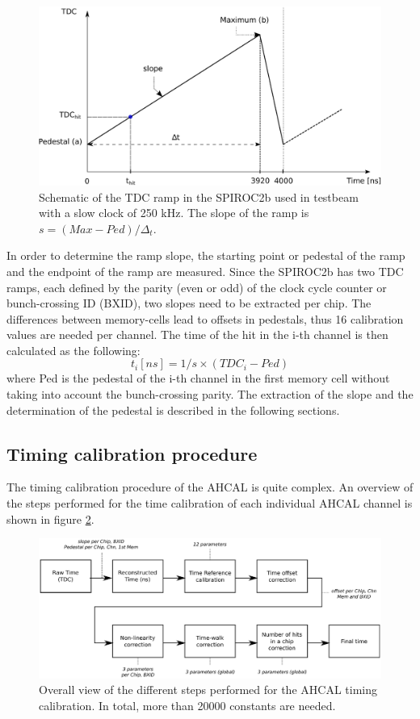 \documentclass{JINST}
\begin{document}
\begin{figure}[htbp!]
  \centering
  \includegraphics[width=0.9\linewidth]{fig/TDCRamp.eps}
  \caption{Schematic of the TDC ramp in the SPIROC2b used in testbeam with a slow clock of 250 kHz. The slope of the ramp is $s = (Max-Ped)/\Delta_t$.} \label{fig:ConvertTime}
\end{figure}

In order to determine the ramp slope, the starting point or pedestal of the ramp and the endpoint of the ramp are measured. Since the SPIROC2b has two TDC ramps, each defined by the parity (even or odd) of the clock cycle counter or bunch-crossing ID (BXID), two slopes need to be extracted per chip. The differences between memory-cells lead to offsets in pedestals, thus 16 calibration values are needed per channel. The time of the hit in the i-th channel is then calculated as the following:
\begin{equation}
  t_{i} [ns] = 1/s \times (TDC_{i} - Ped)
\end{equation}
where Ped is the pedestal of the i-th channel in the first memory cell without taking into account the bunch-crossing parity. The extraction of the slope and the determination of the pedestal is described in the following sections.

\subsection{Timing calibration procedure}

The timing calibration procedure of the AHCAL is quite complex. An overview of the steps performed for the time calibration of each individual AHCAL channel is shown in figure \ref{fig:CalibOverview}.

\begin{figure}[htbp!]
  \centering
  \includegraphics[width=1\linewidth]{fig/TimeCalibOverview.eps}
  \caption{Overall view of the different steps performed for the AHCAL timing calibration. In total, more than 20000 constants are needed.} \label{fig:CalibOverview}
\end{figure}
\end{document}
